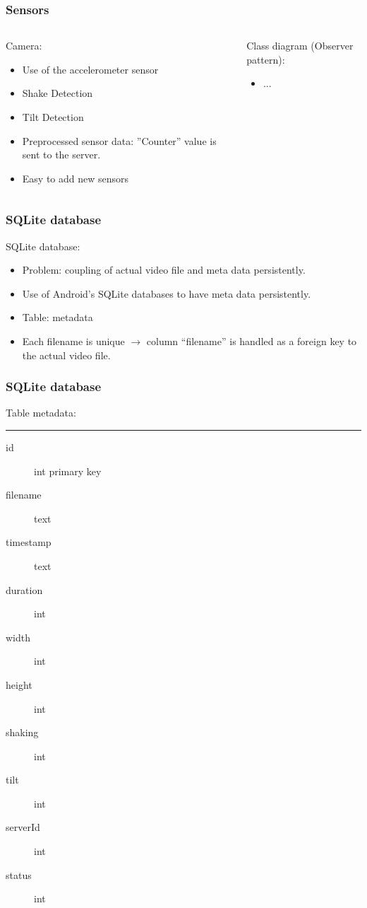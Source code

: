 \begin{frame}	
	\frametitle{Sensors}
	\begin{columns}[t]
		\begin{column}[t]{0.5\linewidth}
			Camera:
			\begin{itemize}
				\item Use of the accelerometer sensor
				\item Shake Detection
				\item Tilt Detection
				\item Preprocessed sensor data: ”Counter” value is sent to the server.
				\item Easy to add new sensors
			\end{itemize}
		\end{column}
		\begin{column}[t]{0.5\linewidth}
			Class diagram (Observer pattern): 
			\begin{itemize}
				\item ...
			\end{itemize}
			
		\end{column}		
	\end{columns}	
\end{frame}

\begin{frame}	
	\frametitle{SQLite database}
	SQLite database:
		\begin{itemize}
			\item Problem: coupling of actual video file and meta data persistently. 
			\item Use of Android's SQLite databases to have meta data persistently.
			\item Table: metadata
			\item Each filename is unique $\rightarrow$ column ``filename'' is handled as a foreign key to the actual video file.
		\end{itemize}
\end{frame}

\begin{frame}	
	\frametitle{SQLite database}
		Table metadata: \hrule
		\begin{description}	
			\item[id] int primary key
			\item[filename] text
			\item[timestamp] text
			\item[duration] int
			\item[width] int
			\item[height] int
			\item[shaking] int
			\item[tilt] int
			\item[serverId] int
			\item[status] int
		\end{description}
\end{frame}

